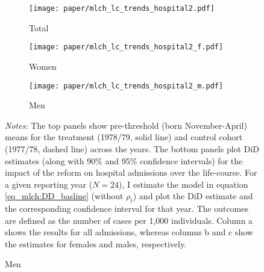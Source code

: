 \begin{landscape}
	\vspace*{\fill}
	\begin{figure}[H]\centering
		\caption{Life-course approach for hospital admission}\label{fig_mlch: lc_hospital2_frg_DD}
		\begin{subfigure}[h]{0.31\linewidth}\centering\caption{Total}
			\texttt{[image: paper/mlch\_lc\_trends\_hospital2.pdf]}
		\end{subfigure}
		\begin{subfigure}[h]{0.31\linewidth}\centering\caption{Women}
			\texttt{[image: paper/mlch\_lc\_trends\_hospital2\_f.pdf]}
		\end{subfigure}
		\begin{subfigure}[h]{0.31\linewidth}\centering\caption{Men}
			\texttt{[image: paper/mlch\_lc\_trends\_hospital2\_m.pdf]}
		\end{subfigure}
	
		\scriptsize
		\begin{minipage}{\linewidth}
			\emph{Notes:} The top panels show pre-threshold (born November-April) means for the treatment (1978/79, solid line) and control cohort (1977/78, dashed line) across the years. The bottom panels plot DiD estimates (along with 90\% and 95\% confidence intervals) for the impact of the reform on hospital admissions over the life-course. For a given reporting year ($N=24$), I estimate the model in equation \ref{eq_mlch:DD_basline} (without $\rho_t$) and plot the DiD estimate and the corresponding confidence interval for that year. The outcomes are defined as the number of cases per 1,000 individuals. Column a shows the results for all admissions, whereas columns b and c show the estimates for females and males, respectively.
		\end{minipage}
	\end{figure}
	\vspace*{\fill}\clearpage
\end{landscape}
\restoregeometry


%


